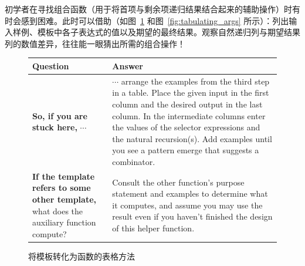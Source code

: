 \begin{notebox}[表格辅助法]
初学者在寻找组合函数（用于将首项与剩余项递归结果结合起来的辅助操作）时有时会感到困难。此时可以借助（如图~\ref{fig:table_method} 和图~\ref{fig:tabulating_args} 所示）：列出输入样例、模板中各子表达式的值以及期望的最终结果。观察自然递归列与期望结果列的数值差异，往往能一眼猜出所需的组合操作！
\end{notebox}

\begin{figure}[htbp]
  \centering
  \footnotesize
  \setlength{\tabcolsep}{4pt}
  \begin{tabular}{@{}>{\raggedright\arraybackslash}p{}>{\raggedright\arraybackslash}p{}@{}}
    \toprule
    \textbf{Question} & \textbf{Answer} \\
    \midrule
    \textbf{So, if you are stuck here,} $\cdots$ &
    $\cdots$ arrange the examples from the third step in a table. Place the given input in the first column and the desired output in the last column. In the intermediate columns enter the values of the selector expressions and the natural recursion(s). Add examples until you see a pattern emerge that suggests a combinator. \\
    \addlinespace[4pt]
    \textbf{If the template refers to some other template,} what does the auxiliary function compute? &
    Consult the other function's purpose statement and examples to determine what it computes, and assume you may use the result even if you haven't finished the design of this helper function. \\
    \bottomrule
  \end{tabular}
  \caption{将模板转化为函数的表格方法}
  \label{fig:table_method}
\end{figure}

